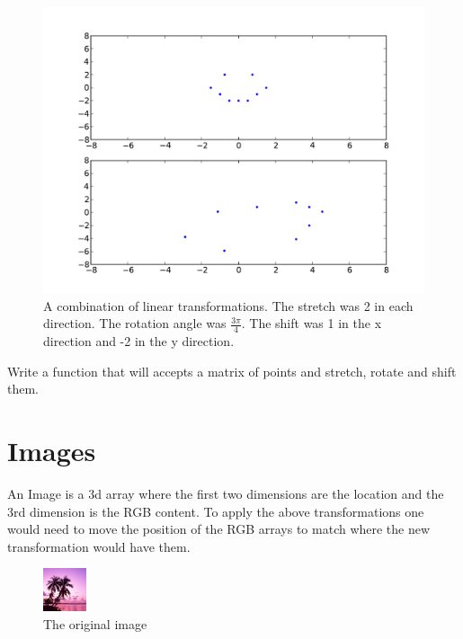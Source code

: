 \begin{figure}[H]
\includegraphics[scale = .5]{combo.pdf}
\caption{
A combination of linear transformations.
The stretch was 2 in each direction.
The rotation angle was $\frac{3\pi}{4}$.
The shift was 1 in the x direction and -2 in the y direction.}
\label{basis:combo}
\end{figure}

\begin{problem}
Write a function that will accepts a matrix of points and stretch, rotate and shift them.
\end{problem}

\section*{Images}

An Image is a 3d array where the first two dimensions are the location and the 3rd dimension is the RGB content.
To apply the above transformations one would need to move the position of the RGB arrays to match where the new transformation would have them.

\begin{figure}[H]
\includegraphics[scale = 2.0]{dream.png}
\caption{The original image}
\end{figure}


